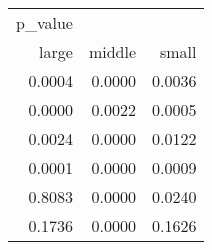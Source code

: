 \begin{tabular}{rrr}
\toprule
p\_value &        \\
  large & middle &  small \\
 0.0004 & 0.0000 & 0.0036 \\
\midrule
 0.0000 & 0.0022 & 0.0005 \\
 0.0024 & 0.0000 & 0.0122 \\
 0.0001 & 0.0000 & 0.0009 \\
 0.8083 & 0.0000 & 0.0240 \\
 0.1736 & 0.0000 & 0.1626 \\
\bottomrule
\end{tabular}
